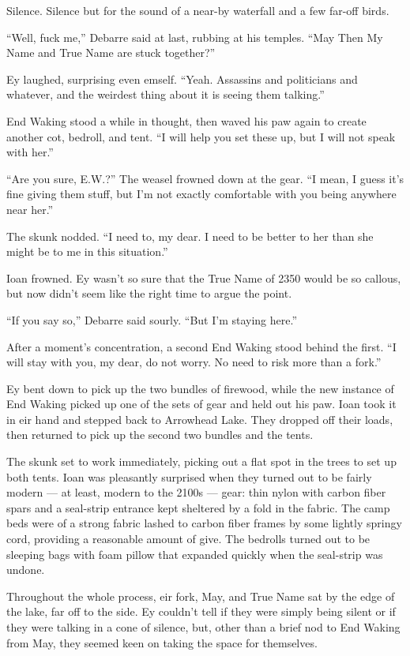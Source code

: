 Silence. Silence but for the sound of a near-by waterfall and a few far-off birds.

``Well, fuck me,'' Debarre said at last, rubbing at his temples. ``May Then My Name and True Name are stuck together?''

Ey laughed, surprising even emself. ``Yeah. Assassins and politicians and whatever, and the weirdest thing about it is seeing them talking.''

End Waking stood a while in thought, then waved his paw again to create another cot, bedroll, and tent. ``I will help you set these up, but I will not speak with her.''

``Are you sure, E.W.?'' The weasel frowned down at the gear. ``I mean, I guess it's fine giving them stuff, but I'm not exactly comfortable with you being anywhere near her.''

The skunk nodded. ``I need to, my dear. I need to be better to her than she might be to me in this situation.''

Ioan frowned. Ey wasn't so sure that the True Name of 2350 would be so callous, but now didn't seem like the right time to argue the point.

``If you say so,'' Debarre said sourly. ``But I'm staying here.''

After a moment's concentration, a second End Waking stood behind the first. ``I will stay with you, my dear, do not worry. No need to risk more than a fork.''

Ey bent down to pick up the two bundles of firewood, while the new instance of End Waking picked up one of the sets of gear and held out his paw. Ioan took it in eir hand and stepped back to Arrowhead Lake. They dropped off their loads, then returned to pick up the second two bundles and the tents.

The skunk set to work immediately, picking out a flat spot in the trees to set up both tents. Ioan was pleasantly surprised when they turned out to be fairly modern — at least, modern to the 2100s — gear: thin nylon with carbon fiber spars and a seal-strip entrance kept sheltered by a fold in the fabric. The camp beds were of a strong fabric lashed to carbon fiber frames by some lightly springy cord, providing a reasonable amount of give. The bedrolls turned out to be sleeping bags with foam pillow that expanded quickly when the seal-strip was undone.

Throughout the whole process, eir fork, May, and True Name sat by the edge of the lake, far off to the side. Ey couldn't tell if they were simply being silent or if they were talking in a cone of silence, but, other than a brief nod to End Waking from May, they seemed keen on taking the space for themselves.

